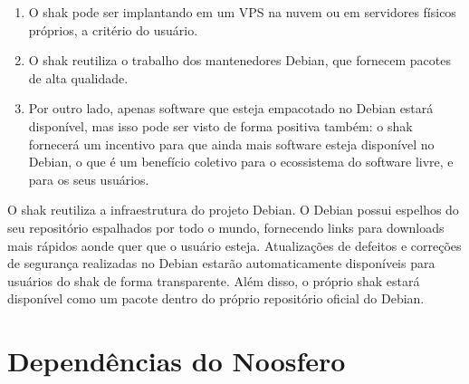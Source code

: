 \begin{anexosenv}
\begin{enumerate}
  \item O shak pode ser implantando em um VPS na nuvem ou em servidores físicos
  próprios, a critério do usuário.
  \item O shak reutiliza o trabalho dos mantenedores Debian, que fornecem pacotes
  de alta qualidade.
  \item Por outro lado, apenas software que esteja empacotado no Debian estará
  disponível, mas isso pode ser visto de forma positiva também: o shak
  fornecerá um incentivo para que ainda mais software esteja disponível no
  Debian, o que é um benefício coletivo para o ecossistema do software livre, e
  para os seus usuários.
\end{enumerate}

O shak reutiliza a infraestrutura do projeto Debian. O Debian possui espelhos 
do seu repositório espalhados por todo o mundo, fornecendo links para 
downloads mais rápidos aonde quer que o usuário esteja. Atualizações de 
defeitos e correções de segurança realizadas no Debian estarão automaticamente 
disponíveis para usuários do shak de forma transparente. Além disso, o 
próprio shak estará disponível como um pacote dentro do próprio repositório oficial do Debian.

\chapter{Dependências do Noosfero}


\end{anexosenv}
